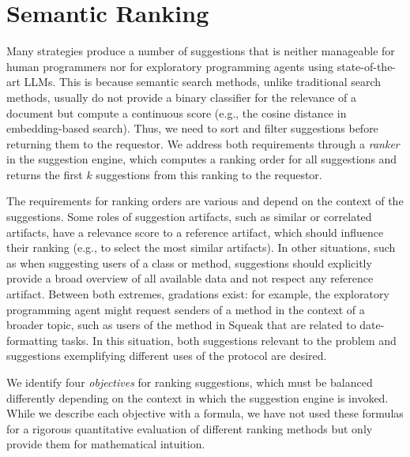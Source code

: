 
\section{Semantic Ranking}
\label{sec:suggestions/ranking}

Many strategies produce a number of suggestions that is neither manageable for human programmers nor for exploratory programming agents using state-of-the-art LLMs.
This is because semantic search methods, unlike traditional search methods, usually do not provide a binary classifier for the relevance of a document but compute a continuous score (e.g., the cosine distance in embedding-based search).
Thus, we need to sort and filter suggestions before returning them to the requestor.
We address both requirements through a \emph{ranker} in the suggestion engine, which computes a ranking order for all suggestions and returns the first $k$ suggestions from this ranking to the requestor.

The requirements for ranking orders are various and depend on the context of the suggestions.
Some roles of suggestion artifacts, such as similar or correlated artifacts, have a relevance score to a reference artifact, which should influence their ranking (e.g., to select the most similar artifacts).
In other situations, such as when suggesting users of a class or method, suggestions should explicitly provide a broad overview of all available data and not respect any reference artifact.
Between both extremes, gradations exist: for example, the exploratory programming agent might request senders of a method in the context of a broader topic, such as users of the  method in Squeak that are related to date-formatting tasks.
In this situation, both suggestions relevant to the problem and suggestions exemplifying different uses of the protocol are desired.

We identify four \emph{objectives} for ranking suggestions, which must be balanced differently depending on the context in which the suggestion engine is invoked.
While we describe each objective with a formula, we have not used these formulas for a rigorous quantitative evaluation of different ranking methods but only provide them for mathematical intuition.

